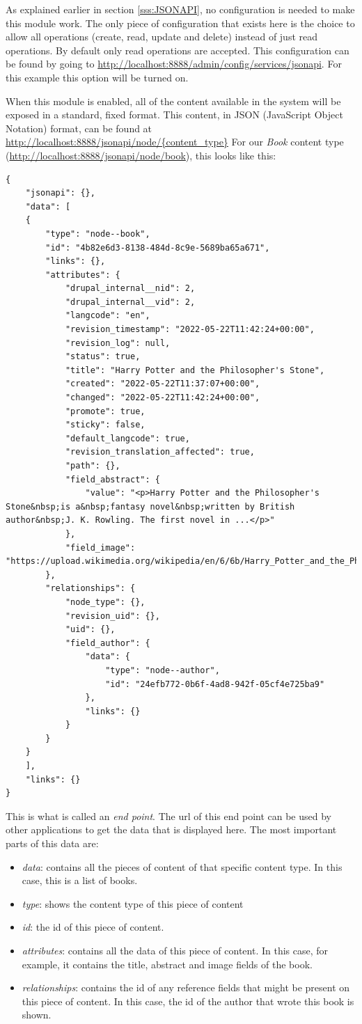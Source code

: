 As explained earlier in section \ref{sss:JSONAPI}, no configuration is needed to make this module work. The only piece of configuration that exists here is the choice to allow all operations (create, read, update and delete) instead of just read operations. By default only read operations are accepted. This configuration can be found by going to \url{http://localhost:8888/admin/config/services/jsonapi}. For this example this option will be turned on.

When this module is enabled, all of the content available in the system will be exposed in a standard, fixed format. This content, in JSON (JavaScript Object Notation) format, can be found at \url{http://localhost:8888/jsonapi/node/{content_type}} For our \emph{Book} content type (\url{http://localhost:8888/jsonapi/node/book}), this looks like this:

\begin{lstlisting}
{
	"jsonapi": {},
	"data": [
	{
		"type": "node--book",
		"id": "4b82e6d3-8138-484d-8c9e-5689ba65a671",
		"links": {},
		"attributes": {
			"drupal_internal__nid": 2,
			"drupal_internal__vid": 2,
			"langcode": "en",
			"revision_timestamp": "2022-05-22T11:42:24+00:00",
			"revision_log": null,
			"status": true,
			"title": "Harry Potter and the Philosopher's Stone",
			"created": "2022-05-22T11:37:07+00:00",
			"changed": "2022-05-22T11:42:24+00:00",
			"promote": true,
			"sticky": false,
			"default_langcode": true,
			"revision_translation_affected": true,
			"path": {},
			"field_abstract": {
				"value": "<p>Harry Potter and the Philosopher's Stone&nbsp;is a&nbsp;fantasy novel&nbsp;written by British author&nbsp;J. K. Rowling. The first novel in ...</p>"
			},
			"field_image": "https://upload.wikimedia.org/wikipedia/en/6/6b/Harry_Potter_and_the_Philosopher%27s_Stone_Book_Cover.jpg"
		},
		"relationships": {
			"node_type": {},
			"revision_uid": {},
			"uid": {},
			"field_author": {
				"data": {
					"type": "node--author",
					"id": "24efb772-0b6f-4ad8-942f-05cf4e725ba9"
				},
				"links": {}
			}
		}
	}
	],
	"links": {}
}
\end{lstlisting}

This is what is called an \emph{end point}. The url of this end point can be used by other applications to get the data that is displayed here. The most important parts of this data are:

\begin{itemize}
	\item \emph{data}: contains all the pieces of content of that specific content type. In this case, this is a list of books.
	\item \emph{type}: shows the content type of this piece of content
	\item \emph{id}: the id of this piece of content.
	\item \emph{attributes}: contains all the data of this piece of content. In this case, for example, it contains the title, abstract and image fields of the book.
	\item \emph{relationships}: contains the id of any reference fields that might be present on this piece of content. In this case, the id of the author that wrote this book is shown.
\end{itemize}

